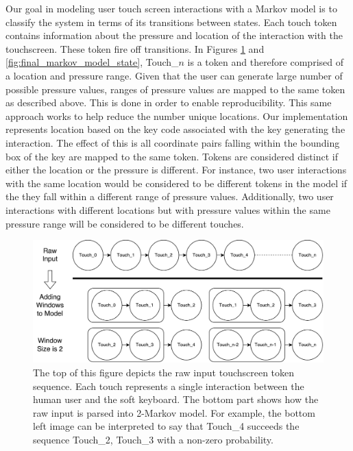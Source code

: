 \documentclass{acm_proc_article-sp}
\begin{document}
Our goal in modeling user touch screen interactions with a Markov model
is to classify the system in terms of its transitions between states. 
Each touch token contains information about the pressure and location 
of the interaction with the touchscreen.
These token fire off transitions.
In Figures \ref{fig:markov_model_building} and \ref{fig:final_markov_model_state}, 
Touch\_$n$ is a token and therefore comprised of a location and pressure range.
%
Given that the user can generate large number of possible pressure values,
ranges of pressure values are mapped to the same token as described above.
This is done in order to enable reproducibility.
This same approach works to help reduce the number unique locations.
Our implementation represents location based
on the key code associated with the key generating the interaction.
The effect of this is 
all coordinate pairs falling within the bounding box
of the key are mapped to the same token.
%
Tokens are considered distinct if
either the location or the pressure is different.
For instance, two user interactions with the same location
would be considered to be different tokens in the model if
the they fall within a different range of pressure values.
Additionally, two user interactions with different locations but with pressure
values within the same pressure range will be considered to be different touches.

\begin{figure}
\centering
\includegraphics[width=.45\textwidth]{marcov_model_building.pdf}
\caption{The top of this figure depicts the raw input touchscreen token sequence. Each touch represents a single interaction between the human user and the soft keyboard. The bottom part shows how the raw input is parsed into 2-Markov model. For example, the bottom left image can be interpreted to say that Touch\_4 succeeds the sequence Touch\_2, Touch\_3 with a non-zero probability.}
\label{fig:markov_model_building}
\end{figure}

\end{document}
